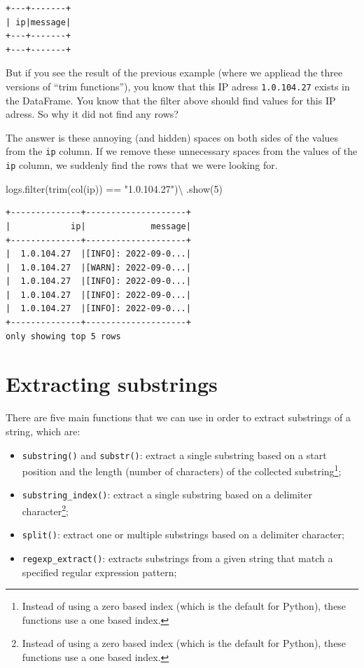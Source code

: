 \documentclass[
  11pt,
  letterpaper,
  DIV=11,
  numbers=noendperiod]{scrreprt}
\newenvironment{Shaded}{\begin{snugshade}}{\end{snugshade}}
\newcommand{\BuiltInTok}[1]{\textcolor[rgb]{0.00,0.23,0.31}{#1}}
\newcommand{\DecValTok}[1]{\textcolor[rgb]{0.68,0.00,0.00}{#1}}
\newcommand{\NormalTok}[1]{\textcolor[rgb]{0.00,0.23,0.31}{#1}}
\newcommand{\OperatorTok}[1]{\textcolor[rgb]{0.37,0.37,0.37}{#1}}
\newcommand{\StringTok}[1]{\textcolor[rgb]{0.13,0.47,0.30}{#1}}
\providecommand{\tightlist}{%
  \setlength{\itemsep}{0pt}\setlength{\parskip}{0pt}}\usepackage{longtable,booktabs,array}
\begin{document}
\begin{verbatim}
+---+-------+
| ip|message|
+---+-------+
+---+-------+
\end{verbatim}

But if you see the result of the previous example (where we appliead the
three versions of ``trim functions''), you know that this IP adress
\texttt{1.0.104.27} exists in the DataFrame. You know that the filter
above should find values for this IP adress. So why it did not find any
rows?

The answer is these annoying (and hidden) spaces on both sides of the
values from the \texttt{ip} column. If we remove these unnecessary
spaces from the values of the \texttt{ip} column, we suddenly find the
rows that we were looking for.

\begin{Shaded}
\begin{Highlighting}[]
\NormalTok{logs.}\BuiltInTok{filter}\NormalTok{(trim(col(}\StringTok{\textquotesingle{}ip\textquotesingle{}}\NormalTok{)) }\OperatorTok{==} \StringTok{"1.0.104.27"}\NormalTok{)}\OperatorTok{\textbackslash{}}
\NormalTok{    .show(}\DecValTok{5}\NormalTok{)}
\end{Highlighting}
\end{Shaded}

\begin{verbatim}
+--------------+--------------------+
|            ip|             message|
+--------------+--------------------+
|  1.0.104.27  |[INFO]: 2022-09-0...|
|  1.0.104.27  |[WARN]: 2022-09-0...|
|  1.0.104.27  |[INFO]: 2022-09-0...|
|  1.0.104.27  |[INFO]: 2022-09-0...|
|  1.0.104.27  |[INFO]: 2022-09-0...|
+--------------+--------------------+
only showing top 5 rows
\end{verbatim}

\hypertarget{extracting-substrings}{%
\section{Extracting substrings}\label{extracting-substrings}}

There are five main functions that we can use in order to extract
substrings of a string, which are:

\begin{itemize}
\tightlist
\item
  \texttt{substring()} and \texttt{substr()}: extract a single substring
  based on a start position and the length (number of characters) of the
  collected substring\footnote{Instead of using a zero based index
    (which is the default for Python), these functions use a one based
    index.};
\item
  \texttt{substring\_index()}: extract a single substring based on a
  delimiter character\footnote{Instead of using a zero based index
    (which is the default for Python), these functions use a one based
    index.};
\item
  \texttt{split()}: extract one or multiple substrings based on a
  delimiter character;
\item
  \texttt{regexp\_extract()}: extracts substrings from a given string
  that match a specified regular expression pattern;
\end{itemize}
\end{document}
